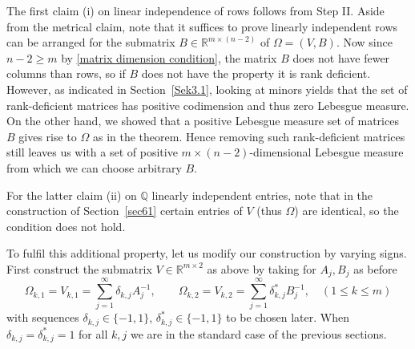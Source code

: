 \documentclass[10pt]{amsart}
\theoremstyle{definition}
\newcommand{\R}{\mathbb{R}}
\newcommand{\Q}{\mathbb{Q}}
\begin{document}
 The first claim (i) on linear independence
 of rows follows from Step II. 
 Aside from the metrical claim, note that
 it suffices to prove linearly independent rows can be arranged for the submatrix $B\in \R^{m\times (n-2)}$ of $\Omega=(V,B)$.
 Now since $n-2\ge m$ by \eqref{matrix dimension condition}, the matrix $B$ does not have fewer columns than rows, 
 so if $B$ does not have the property it is rank deficient. 
 However, as indicated in Section~\ref{Sek3.1}, looking at minors yields that the set of
 rank-deficient matrices has positive codimension and thus
 zero Lebesgue measure. 
 On the other
 hand, we showed that a positive Lebesgue measure set of matrices $B$ gives rise
 to $\Omega$ as in the theorem. Hence removing such rank-deficient matrices still leaves us with a set of positive $m\times (n-2)$-dimensional Lebesgue measure from which we can choose arbitrary $B$.


    For the latter claim (ii) on $\Q$ linearly independent entries,
	note that in the construction of
    Section~\ref{sec61}
 certain entries of $V$ (thus $\Omega$) are identical, so the condition does not hold. 
	
	To fulfil this additional property, let us modify our construction
	by varying signs. First construct the submatrix $V\in \R^{m\times 2}$ as above
	by taking for $A_j, B_j$ as before
	\[
	\Omega_{k,1}=V_{k,1}= \sum_{j=1}^{\infty} \delta_{k,j} A_j^{-1}, \qquad \Omega_{k,2}=V_{k,2}= \sum_{j=1}^{\infty} \delta_{k,j}^{\ast} B_j^{-1}, \quad (1\le k\le m)
	\]
	with sequences $\delta_{k,j}\in\{-1,1\}$, $\delta_{k,j}^{\ast}\in\{-1,1\}$ to be chosen later. When $\delta_{k,j}=\delta_{k,j}^{\ast}=1$ for all $k,j$ we are in the standard case of the previous sections.
	
\end{document}
